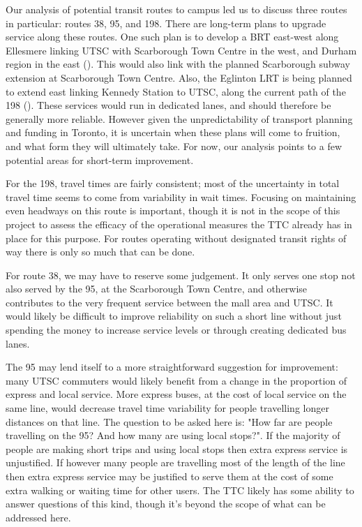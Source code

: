 \documentclass{article}
\begin{document}
	Our analysis of potential transit routes to campus led us to discuss three routes in particular: routes 38, 95, and 198. There are long-term plans to upgrade service along these routes. One such plan is to develop a BRT east-west along Ellesmere linking UTSC with Scarborough Town Centre in the west, and Durham region in the east (\cite{metrolinx2010}). This would also link with the planned Scarborough subway extension at Scarborough Town Centre. 
	Also, the Eglinton LRT is being planned to extend east linking Kennedy Station to UTSC, along the current path of the 198 (\cite{toronto2018}). 
	These services would run in dedicated lanes, and should therefore be generally more reliable. However given the unpredictability of transport planning and funding in Toronto, it is uncertain when these plans will come to fruition, and what form they will ultimately take.
	For now, our analysis points to a few potential areas for short-term improvement. 

	For the 198, travel times are fairly consistent; most of the uncertainty in total travel time seems to come from variability in wait times. Focusing on maintaining even headways on this route is important, though it is not in the scope of this project to assess the efficacy of the operational measures the TTC already has in place for this purpose. For routes operating without designated transit rights of way there is only so much that can be done. 
	
	For route 38, we may have to reserve some judgement. It only serves one stop not also served by the 95, at the Scarborough Town Centre, and otherwise contributes to the very frequent service between the mall area and UTSC. It would likely be difficult to improve reliability on such a short line without just spending the money to increase service levels or through creating dedicated bus lanes. 

	The 95 may lend itself to a more straightforward suggestion for improvement: many UTSC commuters would likely benefit from a change in the proportion of express and local service. More express buses, at the cost of local service on the same line, would decrease travel time variability for people travelling longer distances on that line. The question to be asked here is: "How far are people travelling on the 95? And how many are using local stops?". If the majority of people are making short trips and using local stops then extra express service is unjustified. If however many people are travelling most of the length of the line then extra express service may be justified to serve them at the cost of some extra walking or waiting time for other users. The TTC likely has some ability to answer questions of this kind, though it's beyond the scope of what can be addressed here.
	
\end{document}
